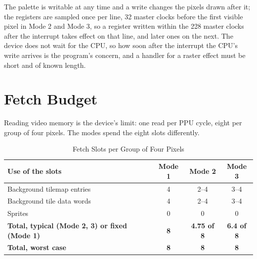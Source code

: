 The palette is writable at any time and a write changes the pixels drawn after it; the registers are sampled once per
line, 32 master clocks before the first visible pixel in Mode 2 and Mode 3, so a register written within the 228 master
clocks after the interrupt takes effect on that line, and later ones on the next. The device does not wait for the CPU,
so how soon after the interrupt the CPU's write arrives is the program's concern, and a handler for a raster effect
must be short and of known length.

\section{Fetch Budget}

Reading video memory is the device's limit: one read per PPU cycle, eight per group of four pixels. The modes spend the
eight slots differently.

\begin{table}[H]
	\centering
	\begin{tabular}{lccc}
		\toprule
		\textbf{Use of the slots}                             & \textbf{Mode 1} & \textbf{Mode 2}    & \textbf{Mode 3}   \\
		\midrule
		Background tilemap entries                            & 4               & 2--4               & 3--4              \\
		Background tile data words                            & 4               & 2--4               & 3--4              \\
		Sprites                                               & 0               & 0                  & 0                 \\
		\midrule
		\textbf{Total, typical (Mode 2, 3) or fixed (Mode 1)} & \textbf{8}      & \textbf{4.75 of 8} & \textbf{6.4 of 8} \\
		\textbf{Total, worst case}                            & \textbf{8}      & \textbf{8}         & \textbf{8}        \\
		\bottomrule
	\end{tabular}
	\caption{Fetch Slots per Group of Four Pixels}
	\label{tab:fetch-budget}
\end{table}

